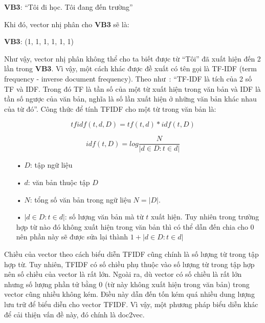 \textbf{VB3}: ``Tôi đi học. Tôi đang đến trường''

Khi đó, vector nhị phân cho \textbf{VB3} sẽ là:

\textbf{VB3}: (1, 1, 1, 1, 1, 1)

Như vậy, vector nhị phân không thể cho ta biết được từ ``Tôi'' đã xuất hiện đến 2 lần trong \textbf{VB3}.
Vì vậy, một cách khác được đề xuất có tên gọi là TF-IDF (term frequency - inverse document frequency).
Theo như~\cite{tf-idf}: ``TF-IDF là tích của 2 số TF và IDF. Trong đó TF là tần số của một từ xuất hiện trong văn bản và IDF là tần số ngược của văn bản, nghĩa là số lần xuất hiện ở những văn bản khác nhau của từ đó''.
Công thức để tính TFIDF cho một từ trong văn bản là:

\begin{equation}
tfidf (t, d, D) = tf(t, d) * idf (t, D)
\end{equation}

\begin{equation}
idf (t, D) = log \frac{N}{|{d \in D: t \in d}|}
\end{equation}

\begin{enumerate}
\item[•]$D$: tập ngữ liệu
\item[•]$d$: văn bản thuộc tập $D$
\item[•]$N$: tổng số văn bản trong ngữ liệu $N = |D|$.
\item[•]$|{d \in D: t \in d}|$: số lượng văn bản mà từ $t$ xuất hiện. Tuy nhiên trong trường hợp từ nào đó không xuất hiện trong văn bản thì có thể dẫn đến chia cho 0 nên phần này sẽ được sửa lại thành  $1 + |{d \in D: t \in d}|$
\end{enumerate}

Chiều của vector theo cách biểu diễn TFIDF cũng chính là số lượng từ trong tập hợp từ.
Tuy nhiên, TFIDF có số chiều phụ thuộc vào số lượng từ trong tập hợp nên số chiều của vector là rất lớn.
Ngoài ra, dù vector có số chiều là rất lớn nhưng số lượng phần tử bằng 0 (từ này không xuất hiện trong văn bản) trong vector cũng nhiều không kém.
Điều này dẫn đến tốn kém quá nhiều dung lượng lưu trữ để biểu diễn cho vector TFIDF.
Vì vậy, một phương pháp biểu diễn khác để cải thiện vấn đề này, đó chính là doc2vec.
%
%

